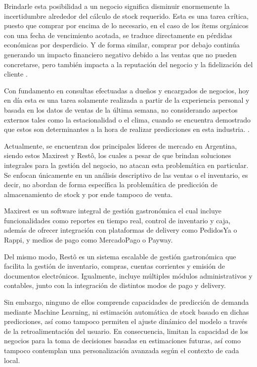 Brindarle esta posibilidad a un negocio significa disminuir enormemente la incertidumbre alrededor del cálculo de stock requerido. Esta es una tarea crítica, puesto que comprar por encima de lo necesario, en el caso de los ítems orgánicos con una fecha de vencimiento acotada, se traduce directamente en pérdidas económicas por desperdicio. Y de forma similar, comprar por debajo continúa generando un impacto financiero negativo debido a las ventas que no pueden concretarse, pero también impacta a la reputación del negocio y la fidelización del cliente \parencite{agrawal2023predictive}.

Con fundamento en consultas efectuadas a dueños y encargados de negocios, hoy en día esta es una tarea solamente realizada a partir de la experiencia personal y basada en los datos de ventas de la última semana, no considerando aspectos externos tales como la estacionalidad o el clima, cuando se encuentra demostrado que estos son determinantes a la hora de realizar predicciones en esta industria. \parencite{tanizaki2019forecasting}.

Actualmente, se encuentran dos principales líderes de mercado en Argentina, siendo estos Maxirest y Restô, los cuales a pesar de que brindan soluciones integrales para la gestión del negocio, no atacan esta problemática en particular. Se enfocan únicamente en un análisis descriptivo de las ventas o el inventario, es decir, no abordan de forma específica la problemática de predicción de almacenamiento de stock y por ende tampoco de venta.  

Maxirest es un software integral de gestión gastronómica el cual incluye funcionalidades como reportes en tiempo real, control de inventario y caja, además de ofrecer integración con plataformas de delivery como PedidosYa o Rappi, y medios de pago como MercadoPago o Payway.  

Del mismo modo, Restô es un sistema escalable de gestión gastronómica que facilita la gestión de inventario, compras, cuentas corrientes y emisión de documentos electrónicos. Igualmente, incluye múltiples módulos administrativos y contables, junto con la integración de distintos modos de pago y delivery. 

Sin embargo, ninguno de ellos comprende capacidades de predicción de demanda mediante Machine Learning, ni estimación automática de stock basado en dichas predicciones, así como tampoco permiten el ajuste dinámico del modelo a través de la retroalimentación del usuario. En consecuencia, limitan la capacidad de los negocios para la toma de decisiones basadas en estimaciones futuras, así como tampoco contemplan una personalización avanzada según el contexto de cada local.  

